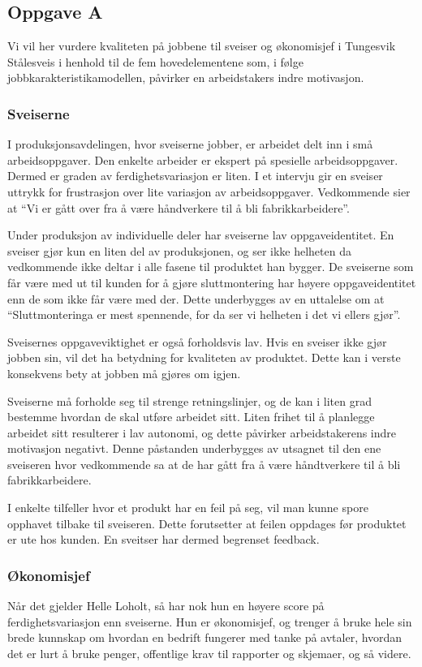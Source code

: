 

\subsection{Oppgave A}
Vi vil her vurdere kvaliteten på jobbene til sveiser og økonomisjef i Tungesvik Stålesveis i henhold til de fem hovedelementene som, i følge jobbkarakteristikamodellen, påvirker en arbeidstakers indre motivasjon.

\subsubsection{Sveiserne}
I produksjonsavdelingen, hvor sveiserne jobber, er arbeidet delt inn i små arbeidsoppgaver.
Den enkelte arbeider er ekspert på spesielle arbeidsoppgaver.
Dermed er graden av ferdighetsvariasjon er liten.
I et intervju gir en sveiser uttrykk for frustrasjon over lite variasjon av arbeidsoppgaver.
Vedkommende sier at “Vi er gått over fra å være håndverkere til å bli fabrikkarbeidere”.

Under produksjon av individuelle deler har sveiserne lav oppgaveidentitet.
En sveiser gjør kun en liten del av produksjonen, og ser ikke helheten da vedkommende ikke deltar i alle fasene til produktet han bygger.
De sveiserne som får være med ut til kunden for å gjøre sluttmontering har høyere oppgaveidentitet enn de som ikke får være med der.
Dette underbygges av en uttalelse om at “Sluttmonteringa er mest spennende, for da ser vi helheten i det vi ellers gjør”.

Sveisernes oppgaveviktighet er også forholdsvis lav.
Hvis en sveiser ikke gjør jobben sin, vil det ha betydning for kvaliteten av produktet.
Dette kan i verste konsekvens bety at jobben må gjøres om igjen.

Sveiserne må forholde seg til strenge retningslinjer, og de kan i liten grad bestemme hvordan de skal utføre arbeidet sitt.
Liten frihet til å planlegge arbeidet sitt resulterer i lav autonomi, og dette påvirker arbeidstakerens indre motivasjon negativt.
Denne påstanden underbygges av utsagnet til den ene sveiseren hvor vedkommende sa at de har gått fra å være håndtverkere til å bli fabrikkarbeidere.

I enkelte tilfeller hvor et produkt har en feil på seg, vil man kunne spore opphavet tilbake til sveiseren.
Dette forutsetter at feilen oppdages før produktet er ute hos kunden.
En sveitser har dermed begrenset feedback.

\subsubsection{Økonomisjef}
Når det gjelder Helle Loholt, så har nok hun en høyere score på ferdighetsvariasjon enn sveiserne. Hun er økonomisjef, og trenger å bruke hele sin brede kunnskap om hvordan en bedrift fungerer med tanke på avtaler, hvordan det er lurt å bruke penger, offentlige krav til rapporter og skjemaer, og så videre.

